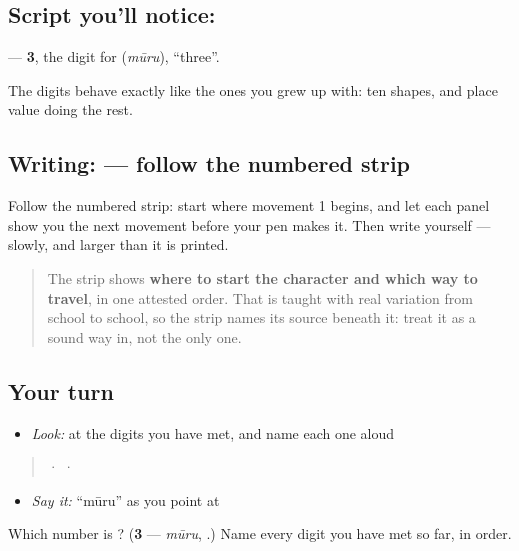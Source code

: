 \subsection*{Script you'll notice: }
\textbf{} — \textbf{3}, the digit for \textbf{} (\emph{mūru}), \textquotedblleft{}three\textquotedblright{}.

The digits behave exactly like the ones you grew up with: ten shapes, and place value doing the rest.

\subsection*{Writing:  — follow the numbered strip}

Follow the numbered strip: start where movement 1 begins, and let each panel show you the next movement before your pen makes it. Then write  yourself — slowly, and larger than it is printed.

\begin{quote}
The strip shows \textbf{where to start the character and which way to travel}, in one attested order. That is taught with real variation from school to school, so the strip names its source beneath it: treat it as a sound way in, not the only one.
\end{quote}

\subsection*{Your turn}
\begin{itemize}
\raggedright
  \item \emph{Look:} at the digits you have met, and name each one aloud
\end{itemize}

\begin{quote}
  ·    ·  
\end{quote}

\begin{itemize}
\raggedright
  \item \emph{Say it:} \textquotedblleft{}mūru\textquotedblright{} as you point at 
\end{itemize}

\begin{tcolorbox}[breakable,colback=teal!4,colframe=teal!35!black,title={Before you move on}]
Which number is \textbf{}? (\textbf{3} — \emph{mūru}, .) Name every digit you have met so far, in order.
\end{tcolorbox}
